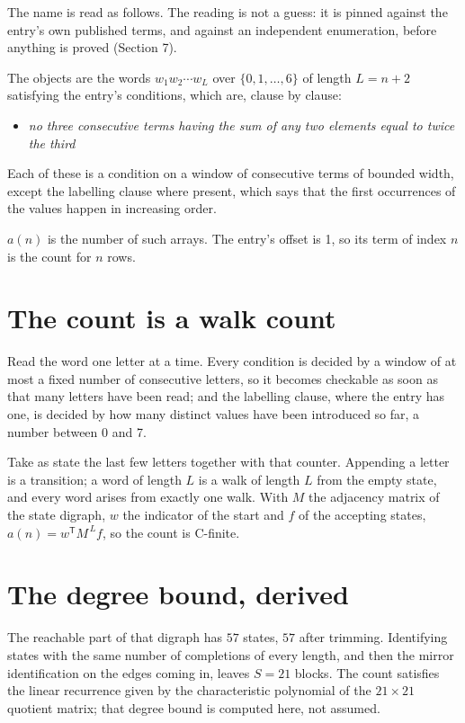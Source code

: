 \documentclass[11pt]{article}
\theoremstyle{definition}
\begin{document}
The name is read as follows. The reading is not a guess: it is pinned against the entry's own published terms, and against an independent enumeration, before anything is proved (Section 7).

The objects are the words $w_1 w_2 \cdots w_L$ over $\{0,1,\dots,6\}$ of length $L = n + 2$ satisfying the entry's conditions, which are, clause by clause:

\begin{itemize}

\item {\itshape no three consecutive terms having the sum of any two elements equal to twice the third}

\end{itemize}

Each of these is a condition on a window of consecutive terms of bounded width, except the labelling clause where present, which says that the first occurrences of the values happen in increasing order.

$a(n)$ is the number of such arrays. The entry's offset is 1, so its term of index $n$ is the count for $n$ rows.

\section{The count is a walk count}

Read the word one letter at a time. Every condition is decided by a window of at most a fixed number of consecutive letters, so it becomes checkable as soon as that many letters have been read; and the labelling clause, where the entry has one, is decided by how many distinct values have been introduced so far, a number between $0$ and 7.

Take as state the last few letters together with that counter. Appending a letter is a transition; a word of length $L$ is a walk of length $L$ from the empty state, and every word arises from exactly one walk. With $M$ the adjacency matrix of the state digraph, $w$ the indicator of the start and $f$ of the accepting states, $a(n) = w^{\mathsf T}M^{\,L}f$, so the count is C-finite.

\section{The degree bound, derived}

The reachable part of that digraph has $57$ states, $57$ after trimming. Identifying states with the same number of completions of every length, and then the mirror identification on the edges coming in, leaves $S = 21$ blocks. The count satisfies the linear recurrence given by the characteristic polynomial of the $21\times21$ quotient matrix; that degree bound is computed here, not assumed.
\end{document}
